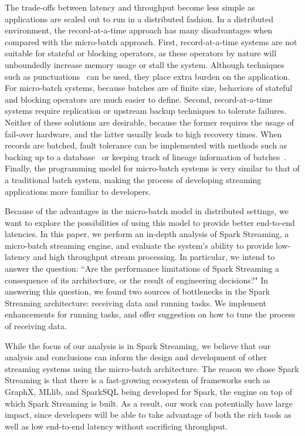 The trade-offs between latency and throughput become less simple as applications are scaled out to run in a distributed fashion. In a distributed environment, the record-at-a-time approach has many disadvantages when compared with the micro-batch approach.
First, record-at-a-time systems are not suitable for stateful or blocking operators, as these operators by nature will unboundedly increase memory usage or stall the system. Although techniques such as punctuations~\cite{tucker2003exploiting} can be used, they place extra burden on the application. For micro-batch systems, because batches are of finite size, behaviors of stateful and blocking operators are much easier to define.
Second, record-at-a-time systems require replication or upstream backup techniques to tolerate failures. Neither of these solutions are desirable, because the former requires the usage of fail-over hardware, and the latter usually leads to high recovery times. When records are batched, fault tolerance can be implemented with methods such as backing up to a database~\cite{Storm} or keeping track of lineage information of batches~\cite{SparkStreaming}.
Finally, the programming model for micro-batch systems is very similar to that of a traditional batch system, making the process of developing streaming applications more familiar to developers.

Because of the advantages in the micro-batch model in distributed settings, we want to explore the possibilities of using this model to provide better end-to-end latencies. In this paper, we perform an in-depth analysis of Spark Streaming, a micro-batch streaming engine, and evaluate the system's ability to provide low-latency and high throughput stream processing.
In particular, we intend to answer the question: ``Are the performance limitations of Spark Streaming a consequence of its architecture, or the result of engineering decisions?"
In answering this question, we found two sources of bottlenecks  in the Spark Streaming architecture: receiving data and running tasks. We implement enhancements for running tasks, and offer suggestion on how to tune the process of receiving data.

While the focus of our analysis is in Spark Streaming, we believe that our analysis and conclusions can inform the design and development of other streaming systems using the micro-batch architecture. The reason we chose Spark Streaming is that there is a fast-growing ecosystem of frameworks such as GraphX, MLlib, and SparkSQL being developed for Spark, the engine on top of which Spark Streaming is built. As a result, our work can potentially have large impact, since developers will be able to take advantage of both the rich tools as well as low end-to-end latency without sacrificing throughput.

